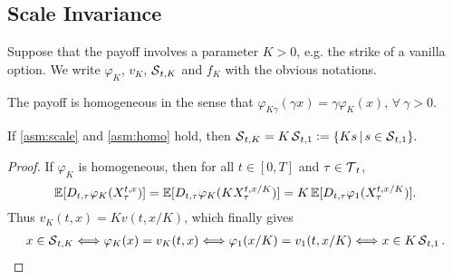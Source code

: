 \subsection{Scale Invariance}
Suppose that the payoff involves a parameter $K>0$, e.g. the strike of a vanilla option.  We write $\varphi_K$, $v_K$, $\operatorname{\mathcal{S}}_{t,K}$ and $f_K$ with the obvious notations. 
\begin{asm} \label{asm:homo}
The payoff is homogeneous in the sense that $\varphi_{K\gamma}(\gamma x)=\gamma \varphi_{K}(x)$, $\forall \  \gamma>0$. 
\end{asm}

\begin{proposition}\label{lem:homogen}
If  \cref{asm:scale} and \ref{asm:homo} hold,
then 
$\operatorname{\mathcal{S}}_{t,K}=K\operatorname{\mathcal{S}}_{t,1}:= \{Ks \,|\, s \in \operatorname{\mathcal{S}}_{t,1}\}.$
\end{proposition}
\begin{proof}
If $\varphi_K$ is homogeneous, then for all $t\in [0,T]$ and $\tau \in \operatorname{\mathcal{T}}_t$,
$$ \operatorname{\mathbb{E}}[D_{t,\tau}\varphi_K(X^{t,x}_{\tau})] = \operatorname{\mathbb{E}}[D_{t,\tau}\varphi_K(K X^{t,x/K}_{\tau})] =  K \operatorname{\mathbb{E}}[D_{t,\tau} \varphi_1(X^{t,x/K}_{\tau})].$$
Thus $v_K(t,x) = K v(t,x/K)$, which finally gives 
\begin{align*}
    x \in \operatorname{\mathcal{S}}_{t,K} \Longleftrightarrow \varphi_K(x) = v_K(t,x)
    \Longleftrightarrow \varphi_1(x/K) = v_1(t,x/K)
    \Longleftrightarrow x \in K\operatorname{\mathcal{S}}_{t,1}.
\end{align*}
\end{proof}



